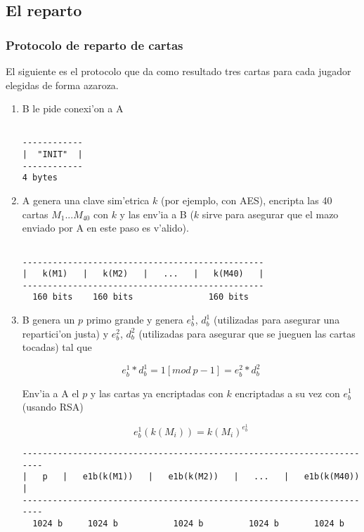\subsection{El reparto}
\subsubsection{Protocolo de reparto de cartas}
El siguiente es el protocolo que da como resultado tres cartas para cada jugador elegidas de forma azaroza.

\begin{enumerate}

\item B le pide conexi'on a A

\begin{verbatim}

------------
|  "INIT"  |
------------
4 bytes

\end{verbatim}




\item A genera una clave sim'etrica $k$ (por ejemplo, con AES), encripta las 40 cartas $M_1...M_40$ con $k$ y las env'ia a B ($k$ sirve para asegurar que el mazo enviado por A en este paso es v'alido).

\begin{verbatim}

------------------------------------------------
|   k(M1)   |   k(M2)   |   ...   |   k(M40)   |
------------------------------------------------
  160 bits    160 bits               160 bits

\end{verbatim}

  


\item B genera un $p$ primo grande y genera $e^1_b$, $d^1_b$ (utilizadas para asegurar una repartici'on justa) y  $e^2_b$, $d^2_b$ (utilizadas para asegurar que se jueguen las cartas tocadas) tal que

$$	e^1_b * d^1_b = 1 [mod\ p-1] = e^2_b * d^2_b $$

Env'ia a A el $p$ y las cartas ya encriptadas con $k$ encriptadas a su vez con $e^1_b$ (usando RSA)

$$	e^1_b(k(M_i)) = k(M_i)^{e^1_b} $$
	

\begin{verbatim}
-----------------------------------------------------------------------
|   p   |   e1b(k(M1))   |   e1b(k(M2))   |   ...   |   e1b(k(M40))   |
-----------------------------------------------------------------------
  1024 b     1024 b           1024 b         1024 b       1024 b       
\end{verbatim}



\end{enumerate}
